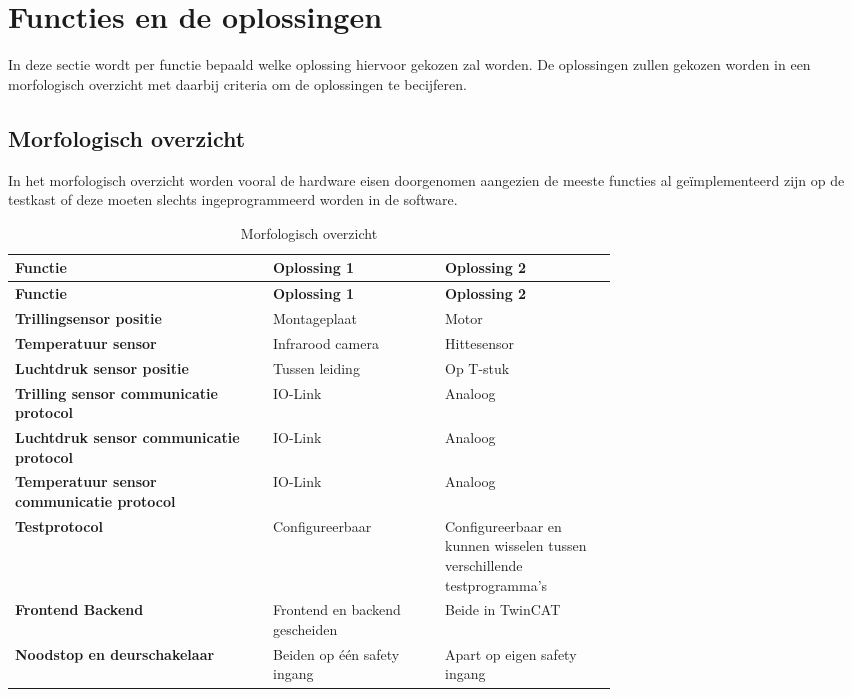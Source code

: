 \section{Functies en de oplossingen}

In deze sectie wordt per functie bepaald welke oplossing hiervoor gekozen zal worden. De oplossingen zullen gekozen worden in een morfologisch overzicht met daarbij criteria om de oplossingen te becijferen.

\subsection{Morfologisch overzicht}

In het morfologisch overzicht worden vooral de hardware eisen doorgenomen aangezien de meeste functies al geïmplementeerd zijn op de testkast of deze moeten slechts ingeprogrammeerd worden in de software.

\begin{xltabular}{\linewidth}{|p{0.3\linewidth}|p{0.2\linewidth}|p{0.2\linewidth}|}
	\caption{Morfologisch overzicht} \\
	\hline
	\textbf{Functie} & \textbf{Oplossing 1} & \textbf{Oplossing 2} \\
	\hline
	\endfirsthead
	\hline
	\textbf{Functie} & \textbf{Oplossing 1} & \textbf{Oplossing 2} \\
	\hline
	\endhead
	\hline
	\endfoot
	\hline
	\endlastfoot
	\textbf{Trillingsensor positie} &  Montageplaat & Motor \\
	\hline
	\textbf{Temperatuur sensor} &  Infrarood camera & Hittesensor \\
	\hline
	\textbf{Luchtdruk sensor positie} & Tussen leiding &  Op T-stuk \\
	\hline
	\textbf{Trilling sensor communicatie protocol} &  IO-Link & Analoog \\
	\hline
	\textbf{Luchtdruk sensor communicatie protocol} &   IO-Link & Analoog \\
	\hline 
	\textbf{Temperatuur sensor communicatie protocol} &  IO-Link & Analoog \\
	\hline
	\textbf{Testprotocol} & Configureerbaar &  Configureerbaar en kunnen wisselen tussen verschillende testprogramma's \\
	\hline
	\textbf{Frontend Backend} &  Frontend en backend gescheiden & Beide in TwinCAT \\
	\hline
	\textbf{Noodstop en deurschakelaar} & Beiden op één safety ingang &  Apart op eigen safety ingang \\
	\hline
\end{xltabular}

